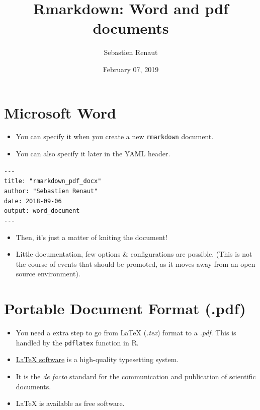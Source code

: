 \documentclass[]{article}
\title{Rmarkdown: Word and pdf documents}
\author{Sebastien Renaut}
\date{February 07, 2019}
\begin{document}
\maketitle

\hypertarget{microsoft-word}{%
\section{Microsoft Word}\label{microsoft-word}}

\begin{itemize}
\item
  You can specify it when you create a new \texttt{rmarkdown} document.
\item
  You can also specify it later in the YAML header.
\end{itemize}

\texttt{-\/-\/-}\\
\texttt{title:\ "rmarkdown\_pdf\_docx"}~\\
\texttt{author:\ "Sebastien\ Renaut"}~\\
\texttt{date:\ \textquotesingle{}2018-09-06\textquotesingle{}}~\\
\texttt{output:\ word\_document}~\\
\texttt{-\/-\/-}

\begin{itemize}
\item
  Then, it's just a matter of kniting the document!
\item
  Little documentation, few options \& configurations are possible.
  (This is not the course of events that should be promoted, as it moves
  away from an open source environment).
\end{itemize}

\hypertarget{portable-document-format-.pdf}{%
\section{Portable Document Format
(.pdf)}\label{portable-document-format-.pdf}}

\begin{itemize}
\item
  You need a extra step to go from LaTeX (\emph{.tex}) format to a
  \emph{.pdf}. This is handled by the \texttt{pdflatex} function in R.
\item
  \href{https://www.latex-project.org}{LaTeX software} is a high-quality
  typesetting system.
\item
  It is the \emph{de facto} standard for the communication and
  publication of scientific documents.
\item
  LaTeX is available as free software.
\end{itemize}
\end{document}
